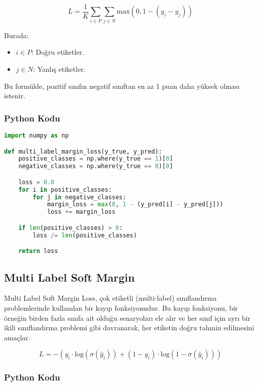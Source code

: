 \[ L = \frac{1}{K} \sum_{i \in P} \sum_{j \in N} \text{max}(0, 1 - (y_i - y_j)) \]

Burada:

\begin{itemize}
    \item $i \in P$: Doğru etiketler.
    \item $j \in N$: Yanlış etiketler.
\end{itemize}

Bu formülde, pozitif sınıfın negatif sınıftan en az 1 puan daha yüksek olması istenir.

\subsubsection{Python Kodu}

\begin{lstlisting}[language=Python]
import numpy as np

def multi_label_margin_loss(y_true, y_pred):
    positive_classes = np.where(y_true == 1)[0]
    negative_classes = np.where(y_true == 0)[0]

    loss = 0.0
    for i in positive_classes:
        for j in negative_classes:
            margin_loss = max(0, 1 - (y_pred[i] - y_pred[j]))
            loss += margin_loss

    if len(positive_classes) > 0:
        loss /= len(positive_classes)

    return loss
\end{lstlisting}

\newpage

\subsection{Multi Label Soft Margin}

Multi Label Soft Margin Loss, çok etiketli (multi-label) sınıflandırma problemlerinde kullanılan bir kayıp fonksiyonudur. Bu kayıp fonksiyonu, bir örneğin birden fazla sınıfa ait olduğu senaryoları ele alır ve her sınıf için ayrı bir ikili sınıflandırma problemi gibi davranarak, her etiketin doğru tahmin edilmesini amaçlar.

\[ L = - (y_i \cdot \text{log}(\sigma (\hat{y}_i)) + (1 - y_i) \cdot \text{log}(1 - \sigma (\hat{y}_i))) \]

\subsubsection{Python Kodu}

